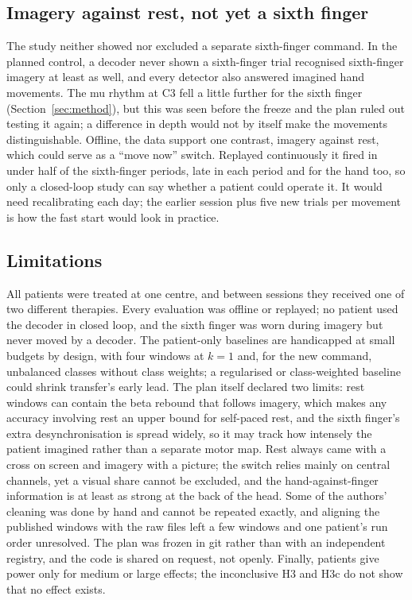 \subsection{Imagery against rest, not yet a sixth finger}
The study neither showed nor excluded a separate sixth-finger command. In the planned control, a
decoder never shown a sixth-finger trial recognised sixth-finger imagery at least as well, and
every detector also answered imagined hand movements. The mu rhythm at C3 fell a little further
for the sixth finger (Section~\ref{sec:method}), but this was seen before the freeze and the plan
ruled out testing it again; a difference in depth would not by
itself make the movements distinguishable. Offline, the data support one contrast, imagery against
rest, which could serve as a ``move now'' switch. Replayed continuously it fired in under half of
the sixth-finger periods, late in each period and for the hand too, so only a closed-loop study
can say whether a patient could operate it. It would need recalibrating each day; the earlier
session plus five new trials per movement is how the fast start would look in practice.

\subsection{Limitations}
All \nSubjects{} patients were treated at one centre, and between sessions they received one of
two different therapies. Every evaluation was offline or replayed; no patient used the decoder in
closed loop, and the sixth finger was worn during imagery but never moved by a decoder. The
patient-only baselines are handicapped at small budgets by design, with four windows at $k = 1$
and, for the new command, unbalanced classes without class weights; a regularised or
class-weighted baseline could shrink transfer's early lead. The plan itself declared two limits:
rest windows can contain the beta rebound that follows imagery, which makes any accuracy involving
rest an upper bound for self-paced rest, and the sixth finger's extra desynchronisation is spread
widely, so it may track how intensely the patient imagined rather than a separate motor map. Rest
always came with a cross on screen and imagery with a picture; the switch relies mainly on central
channels, yet a visual share cannot be excluded, and the hand-against-finger information is at
least as strong at the back of the head. Some of the authors' cleaning was done by hand and cannot
be repeated exactly, and aligning the published windows with the raw files left a few windows and
one patient's run order unresolved. The plan was frozen in git rather than with an independent
registry, and the code is shared on request, not openly. Finally, \nPre{} patients give power only
for medium or large effects; the inconclusive H3 and H3c do not show that no effect exists.

